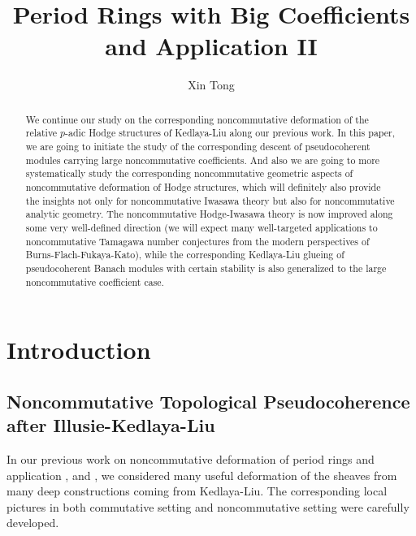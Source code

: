 \documentclass[12pt]{amsart}
\theoremstyle{definition}
\numberwithin{equation}{section}
\begin{document}
\normalfont



\title{Period Rings with Big Coefficients and Application II}
\author{Xin Tong}



\maketitle


\begin{abstract}
\rm  We continue our study on the corresponding noncommutative deformation of the relative $p$-adic Hodge structures of Kedlaya-Liu along our previous work. In this paper, we are going to initiate the study of the corresponding descent of pseudocoherent modules carrying large noncommutative coefficients. And also we are going to more systematically study the corresponding noncommutative geometric aspects of noncommutative deformation of Hodge structures, which will definitely also provide the insights not only for noncommutative Iwasawa theory but also for noncommutative analytic geometry. The noncommutative Hodge-Iwasawa theory is now improved along some very well-defined direction (we will expect many well-targeted applications to noncommutative Tamagawa number conjectures from the modern perspectives of Burns-Flach-Fukaya-Kato), while the corresponding Kedlaya-Liu glueing of pseudocoherent Banach modules with certain stability is also generalized to the large noncommutative coefficient case. 
\end{abstract}



\newpage

\tableofcontents


\newpage



\section{Introduction}


\subsection{Noncommutative Topological Pseudocoherence after Illusie-Kedlaya-Liu}


\noindent In our previous work on noncommutative deformation of period rings and application \cite{T1}, \cite{T2} and \cite{T3}, we considered many useful deformation of the sheaves from many deep constructions coming from Kedlaya-Liu. The corresponding local pictures in both commutative setting and noncommutative setting were carefully developed. \\
\end{document}
